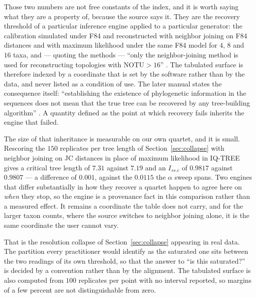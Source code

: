 \documentclass[preprint,12pt,authoryear]{elsarticle}
\newcommand{\Issc}{I_{ss.c}}
\theoremstyle{definition}
\theoremstyle{remark}
\begin{document}
Those two numbers are not free constants of the index, and it is worth saying
what they are a property of, because the source says it. They are the
recovery threshold of a particular inference engine applied to a particular
generator: the calibration simulated under F84 and reconstructed with
neighbor joining on F84 distances and with maximum likelihood under the same
F84 model for $4$, $8$ and $16$ taxa, and --- quoting the methods --- ``only
the neighbor-joining method is used for reconstructing topologies with
NOTU${}>16$'' \citep{xia2003iss}. The tabulated surface is therefore indexed
by a coordinate that is set by the software rather than by the data, and
never listed as a condition of use. The later manual states the consequence
itself: ``establishing the existence of phylogenetic information in the
sequences does not mean that the true tree can be recovered by any
tree-building algorithm'' \citep{xia2009handbook}. A quantity defined as the
point at which recovery fails inherits the engine that failed.

The size of that inheritance is measurable on our own quartet, and it is
small. Rescoring the $150$ replicates per tree length of
Section~\ref{sec:collapse} with neighbor joining on JC distances in place of
maximum likelihood in IQ-TREE gives a critical tree length of $7.31$ against
$7.19$ and an $\Issc$ of $0.9817$ against $0.9807$ --- a difference of
$0.001$, against the $0.0115$ the $\alpha$ sweep spans. Two engines that
differ substantially in how they recover a quartet happen to agree here on
\emph{when} they stop, so the engine is a provenance fact in this comparison
rather than a measured effect. It remains a coordinate the table does not
carry, and for the larger taxon counts, where the source switches to neighbor
joining alone, it is the same coordinate the user cannot vary.

That is the resolution collapse of Section~\ref{sec:collapse} appearing in
real data. The partition every practitioner would identify as the saturated
one sits between the two readings of its own threshold, so that the answer to
``is this saturated?'' is decided by a convention rather than by the
alignment. The tabulated surface is also computed from $100$ replicates per
point with no interval reported, so margins of a few percent are not
distinguishable from zero.
\end{document}
